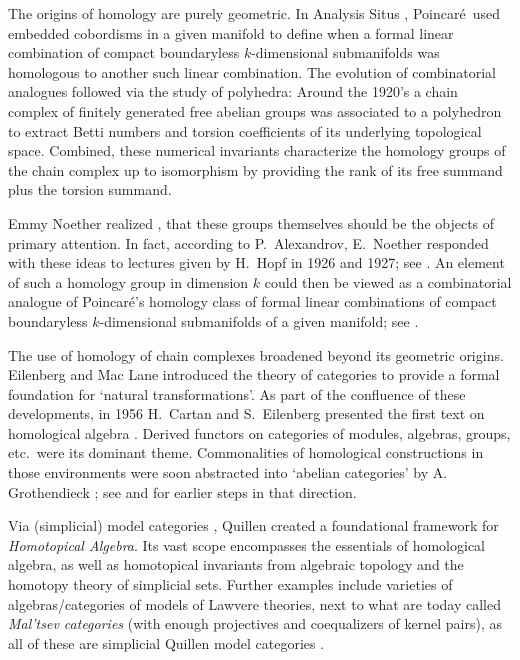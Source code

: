 \documentclass [12pt,oneside]{book}%
\theoremstyle{captionstyle}  %
\newcommand{\Poincare}{Poincaré}
\begin{document}
The origins of homology are purely geometric. In Analysis Situs \cite[\S 5]{HPoincare1895}, \Poincare\ used embedded cobordisms in a given manifold to define when a formal linear combination of compact boundaryless $k$-dimensional submanifolds was homologous to another such linear combination. The evolution of combinatorial analogues followed via the study of polyhedra: Around the 1920's a chain complex of finitely generated free abelian groups was associated to a polyhedron to extract Betti numbers and torsion coefficients of its underlying topological space. Combined, these numerical invariants characterize the homology groups of the chain complex up to isomorphism by providing the rank of its free summand plus the torsion summand. %

Emmy Noether realized \cite{FHirzebruch1999-Noether},\cite[p.\ 174]{ADick1981} that these groups themselves should be the objects of primary attention. In fact, according to P.\ Alexandrov, E.\ Noether responded with these ideas to lectures given by H.\ Hopf in 1926 and 1927; see \cite[p.\ 174]{ADick1981}. An element of such a homology group in dimension $k$ could then be viewed as a combinatorial analogue of  \Poincare's homology class of formal linear combinations of compact boundaryless $k$-dimensional submanifolds of a given manifold; see \cite{HPoincare1895}.

The use of homology of chain complexes broadened beyond its geometric origins. Eilenberg and Mac Lane introduced the theory of categories to provide a formal foundation for `natural transformations'.  As part of the confluence of these developments, in 1956 H.~Cartan and S.~Eilenberg presented the first text on homological algebra \cite{Cartan-Eilenberg}. %
Derived functors on categories of modules, algebras, groups, etc.\ were its dominant theme. Commonalities of homological constructions in those environments were soon abstracted into `abelian categories' by  A. Grothendieck \cite{Tohoku}; %
see \cite{MacLane:Duality} and \cite{Buchsbaum:ExactCats} for earlier steps in that direction. %

Via (simplicial) model categories \cite{Quillen}, Quillen created a foundational framework for \emph{Homotopical Algebra}. Its vast scope encompasses the essentials of homological algebra, as well as homotopical invariants from algebraic topology and the homotopy theory of simplicial sets. Further examples include varieties of algebras/categories of models of Lawvere theories, next to what are today called \emph{Mal'tsev categories} (with enough projectives and coequalizers of kernel pairs), as all of these are simplicial Quillen model categories \cite[II.4]{Quillen}. %
\end{document}
